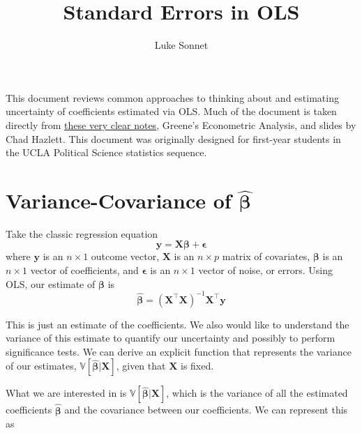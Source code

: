 \documentclass[]{article}
\title{Standard Errors in OLS}
\author{Luke Sonnet}
\date{}
\begin{document}
\maketitle

{
\hypersetup{linkcolor=black}
\setcounter{tocdepth}{1}
\tableofcontents
}
\newcommand{\y}{\mathbf{y}}
\newcommand{\X}{\mathbf{X}}
\newcommand{\bepsilon}{\bm{\epsilon}}
\newcommand{\bbeta}{\bm{\beta}}
\newcommand{\E}{\mathbb{E}}
\newcommand{\V}{\mathbb{V}}

This document reviews common approaches to thinking about and estimating
uncertainty of coefficients estimated via OLS. Much of the document is
taken directly from
\href{https://web.stanford.edu/~mrosenfe/soc_meth_proj3/matrix_OLS_NYU_notes.pdf}{these
very clear notes}, Greene's Econometric Analysis, and slides by Chad
Hazlett. This document was originally designed for first-year students
in the UCLA Political Science statistics sequence.

\hypertarget{variance-covariance-of-hatbmbeta}{%
\section{\texorpdfstring{Variance-Covariance of
\(\hat{\bm{\beta}}\)}{Variance-Covariance of \textbackslash hat\{\textbackslash bm\{\textbackslash beta\}\}}}\label{variance-covariance-of-hatbmbeta}}

Take the classic regression equation
\[\mathbf{y}= \mathbf{X}\bm{\beta}+ \bm{\epsilon}\] where \(\mathbf{y}\)
is an \(n\times 1\) outcome vector, \(\mathbf{X}\) is an \(n \times p\)
matrix of covariates, \(\bm{\beta}\) is an \(n \times 1\) vector of
coefficients, and \(\bm{\epsilon}\) is an \(n \times 1\) vector of
noise, or errors. Using OLS, our estimate of \(\bm{\beta}\) is
\[\hat{\bm{\beta}} = (\mathbf{X}^\top \mathbf{X})^{-1} \mathbf{X}^\top \mathbf{y}\]

This is just an estimate of the coefficients. We also would like to
understand the variance of this estimate to quantify our uncertainty and
possibly to perform significance tests. We can derive an explicit
function that represents the variance of our estimates,
\(\mathbb{V}[\hat{\bm{\beta}}|\mathbf{X}]\), given that \(\mathbf{X}\)
is fixed.

What we are interested in is
\(\mathbb{V}[\hat{\bm{\beta}}|\mathbf{X}]\), which is the variance of
all the estimated coefficients \(\hat{\bm{\beta}}\) and the covariance
between our coefficients. We can represent this as
\end{document}
